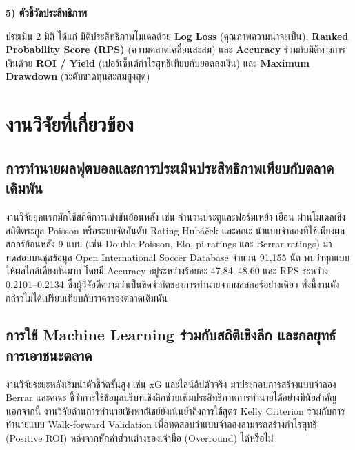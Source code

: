 \par\noindent\textbf{5) ตัวชี้วัดประสิทธิภาพ}\par
ประเมิน 2 มิติ ได้แก่ มิติประสิทธิภาพโมเดลด้วย \textbf{Log Loss} (คุณภาพความน่าจะเป็น), \textbf{Ranked Probability Score (RPS)} (ความคลาดเคลื่อนสะสม) และ \textbf{Accuracy} ร่วมกับมิติทางการเงินด้วย \textbf{ROI / Yield} (เปอร์เซ็นต์กำไรสุทธิเทียบกับยอดลงเงิน) และ \textbf{Maximum Drawdown} (ระดับขาดทุนสะสมสูงสุด)

\section{งานวิจัยที่เกี่ยวข้อง}

\subsection{การทำนายผลฟุตบอลและการประเมินประสิทธิภาพเทียบกับตลาดเดิมพัน}

งานวิจัยยุคแรกมักใช้สถิติการแข่งขันย้อนหลัง เช่น จำนวนประตูและฟอร์มเหย้า-เยือน ผ่านโมเดลเชิงสถิติตระกูล Poisson \cite{dixon1997modelling} หรือระบบจัดอันดับ Rating \cite{hvattum2010using, constantinou2013determining} Hubáček และคณะ \cite{hubacek2021forty} นำแบบจำลองที่ใช้เพียงผลสกอร์ย้อนหลัง 9 แบบ (เช่น Double Poisson, Elo, pi-ratings และ Berrar ratings) มาทดสอบบนชุดข้อมูล Open International Soccer Database \cite{dubitzky2019open} จำนวน 91,155 นัด พบว่าทุกแบบให้ผลใกล้เคียงกันมาก โดยมี Accuracy อยู่ระหว่างร้อยละ 47.84--48.60 และ RPS ระหว่าง 0.2101--0.2134 ซึ่งผู้วิจัยตีความว่าเป็นขีดจำกัดของการทำนายจากผลสกอร์อย่างเดียว ทั้งนี้งานดังกล่าวไม่ได้เปรียบเทียบกับราคาของตลาดเดิมพัน

\subsection{การใช้ Machine Learning ร่วมกับสถิติเชิงลึก และกลยุทธ์การเอาชนะตลาด}

งานวิจัยระยะหลังเริ่มนำตัวชี้วัดขั้นสูง เช่น xG และไลน์อัปตัวจริง มาประกอบการสร้างแบบจำลอง Berrar และคณะ \cite{berrar2019incorporating} ชี้ว่าการใช้ข้อมูลบริบทเชิงลึกช่วยเพิ่มประสิทธิภาพการทำนายได้อย่างมีนัยสำคัญ นอกจากนี้ งานวิจัยด้านการทำนายเชิงพาณิชย์ยังเน้นย้ำถึงการใช้สูตร Kelly Criterion ร่วมกับการทำนายแบบ Walk-forward Validation เพื่อทดสอบว่าแบบจำลองสามารถสร้างกำไรสุทธิ (Positive ROI) หลังจากหักค่าส่วนต่างของเจ้ามือ (Overround) ได้หรือไม่

